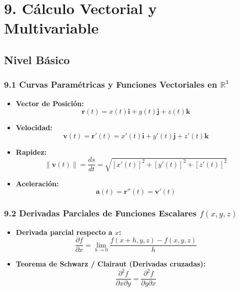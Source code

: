 \documentclass[11pt,a4paper]{article}
\begin{document}
\section*{9. Cálculo Vectorial y Multivariable}

\subsection*{Nivel Básico}

\subsubsection*{9.1 Curvas Paramétricas y Funciones Vectoriales en $\mathbb{R}^3$}

\begin{itemize}
  \item \textbf{Vector de Posición:}
  \[
    \mathbf{r}(t) = x(t)\mathbf{i} + y(t)\mathbf{j} + z(t)\mathbf{k}
  \]
  \item \textbf{Velocidad:}
  \[
    \mathbf{v}(t) = \mathbf{r}'(t) = x'(t)\mathbf{i} + y'(t)\mathbf{j} + z'(t)\mathbf{k}
  \]
  \item \textbf{Rapidez:}
  \[
    \|\mathbf{v}(t)\| = \frac{ds}{dt} = \sqrt{[x'(t)]^2 + [y'(t)]^2 + [z'(t)]^2}
  \]
  \item \textbf{Aceleración:}
  \[
    \mathbf{a}(t) = \mathbf{r}''(t) = \mathbf{v}'(t)
  \]
\end{itemize}

\subsubsection*{9.2 Derivadas Parciales de Funciones Escalares $f(x, y, z)$}

\begin{itemize}
  \item \textbf{Derivada parcial respecto a $x$:}
  \[
    \frac{\partial f}{\partial x} = \lim_{h \to 0} \frac{f(x + h, y, z) - f(x, y, z)}{h}
  \]
  \item \textbf{Teorema de Schwarz / Clairaut (Derivadas cruzadas):}
  \[
    \frac{\partial^2 f}{\partial x \partial y} = \frac{\partial^2 f}{\partial y \partial x}
  \]
\end{itemize}
\end{document}
